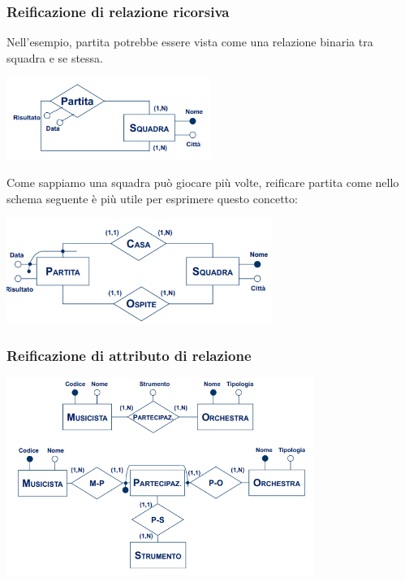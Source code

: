 \documentclass[12pt]{article}
\begin{document}
\subsubsection{Reificazione di relazione ricorsiva}
Nell'esempio, partita potrebbe essere vista come una relazione binaria tra squadra e se stessa.
\begin{center}
    \includegraphics[width = 0.50\textwidth]{Images/49.PNG}
\end{center}
Come sappiamo una squadra può giocare più volte, reificare partita come nello schema seguente è più utile per esprimere questo concetto:
\begin{center}
    \includegraphics[width = 0.65\textwidth]{Images/50.PNG}
\end{center}
\subsubsection{Reificazione di attributo di relazione}
\begin{center}
    \includegraphics[width = 0.75\textwidth]{Images/51.PNG}
\end{center}
\end{document}
